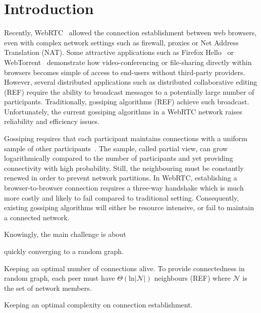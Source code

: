 
\section{Introduction}

Recently, WebRTC~\cite{webrtc} allowed the connection establishment between
web browsers, even with complex network settings such as firewall, proxies or
Net Address Translation (NAT).  Some attractive applications such as Firefox
Hello~\cite{firefoxhello} or WebTorrent~\cite{webtorrent} demonstrate how
video-conferencing or file-sharing directly within browsers becomes simple of
access to end-users without third-party providers. However, several distributed
applications such as distributed collaborative editing (REF) require the
ability to broadcast messages to a potentially large number of
participants. Traditionally, gossiping algorithms (REF) achieve such
broadcast. Unfortunately, the current gossiping algorithms in a WebRTC network
raises reliability and efficiency issues.

Gossiping requires that each participant maintains connections with a uniform
sample of other participants~\cite{jelasity2004peer}. The sample, called
partial view, can grow logarithmically compared to the number of participants
and yet providing connectivity with high probability. Still, the neighbouring
must be constantly renewed in order to prevent network partitions. In WebRTC,
establishing a browser-to-browser connection requires a three-way handshake
which is much more costly and likely to fail compared to traditional
setting. Consequently, existing gossiping algorithms will either be resource
intensive, or fail to maintain a connected network.

Knowingly, the main challenge is about
\begin{inparaenum}[(i)]
\item quickly converging to a random graph.
\item Keeping an optimal number of connections alive. To provide connectedness
  in random graph, each peer must have $\Theta(\text{ln} |\mathcal{N}|)$
  neighbours (REF) where $\mathcal{N}$ is the set of network members.
\item Keeping an optimal complexity on connection establishment.
\end{inparaenum}


